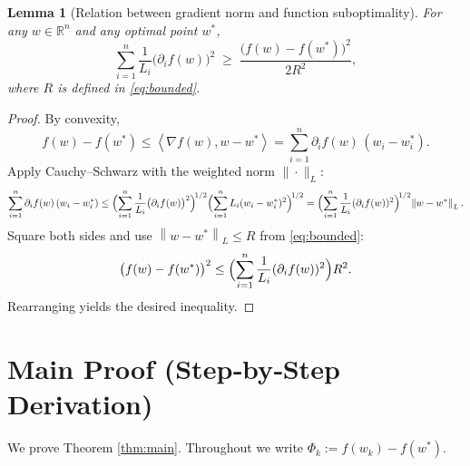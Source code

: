 \documentclass{article}
\newtheorem{lemma}{Lemma}
\newcommand{\R}{\mathbb{R}}
\newcommand{\norm}[1]{\left\lVert #1\right\rVert}
\newcommand{\ip}[2]{\left\langle #1,#2\right\rangle}
\begin{document}
\begin{lemma}[Relation between gradient norm and function suboptimality]
\label{lem:grad2subopt}
For any $w\in\R^{n}$ and any optimal point $w^*$,
\[
\sum_{i=1}^{n}\frac{1}{L_i}\bigl(\partial_i f(w)\bigr)^{2}
\;\ge\;
\frac{\bigl(f(w)-f(w^*)\bigr)^{2}}{2R^{2}},
\]
where $R$ is defined in \eqref{eq:bounded}.
\end{lemma}
\begin{proof}
By convexity,
\[
f(w)-f(w^*)\le \ip{\nabla f(w)}{w-w^*}
=\sum_{i=1}^{n}\partial_i f(w)\,(w_i-w_i^*).
\]
Apply Cauchy–Schwarz with the weighted norm $\|\cdot\|_{L}$:
\[
\sum_{i=1}^{n}\partial_i f(w)\,(w_i-w_i^*)
\le
\Bigl(\sum_{i=1}^{n}\frac{1}{L_i}\bigl(\partial_i f(w)\bigr)^{2}\Bigr)^{\!1/2}
\Bigl(\sum_{i=1}^{n}L_i (w_i-w_i^*)^{2}\Bigr)^{\!1/2}
=
\Bigl(\sum_{i=1}^{n}\frac{1}{L_i}(\partial_i f(w))^{2}\Bigr)^{\!1/2}\!\norm{w-w^*}_{L}.
\]
Square both sides and use $\norm{w-w^*}_{L}\le R$ from \eqref{eq:bounded}:
\[
\bigl(f(w)-f(w^*)\bigr)^{2}
\le
\Bigl(\sum_{i=1}^{n}\frac{1}{L_i}(\partial_i f(w))^{2}\Bigr) R^{2}.
\]
Rearranging yields the desired inequality. \hfill\qedsymbol
\end{proof}

\section*{Main Proof (Step‑by‑Step Derivation)}
We prove Theorem \ref{thm:main}.  Throughout we write $\Phi_k:=f(w_k)-f(w^*)$.
\end{document}
